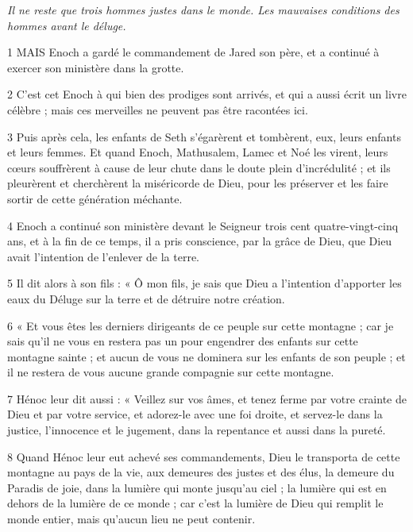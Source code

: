 \par \textit{Il ne reste que trois hommes justes dans le monde. Les mauvaises conditions des hommes avant le déluge.}

\par 1 MAIS Enoch a gardé le commandement de Jared son père, et a continué à exercer son ministère dans la grotte.

\par 2 C'est cet Enoch à qui bien des prodiges sont arrivés, et qui a aussi écrit un livre célèbre ; mais ces merveilles ne peuvent pas être racontées ici.

\par 3 Puis après cela, les enfants de Seth s'égarèrent et tombèrent, eux, leurs enfants et leurs femmes. Et quand Enoch, Mathusalem, Lamec et Noé les virent, leurs cœurs souffrèrent à cause de leur chute dans le doute plein d'incrédulité ; et ils pleurèrent et cherchèrent la miséricorde de Dieu, pour les préserver et les faire sortir de cette génération méchante.

\par 4 Enoch a continué son ministère devant le Seigneur trois cent quatre-vingt-cinq ans, et à la fin de ce temps, il a pris conscience, par la grâce de Dieu, que Dieu avait l'intention de l'enlever de la terre.

\par 5 Il dit alors à son fils : « Ô mon fils, je sais que Dieu a l'intention d'apporter les eaux du Déluge sur la terre et de détruire notre création.

\par 6 « Et vous êtes les derniers dirigeants de ce peuple sur cette montagne ; car je sais qu'il ne vous en restera pas un pour engendrer des enfants sur cette montagne sainte ; et aucun de vous ne dominera sur les enfants de son peuple ; et il ne restera de vous aucune grande compagnie sur cette montagne.

\par 7 Hénoc leur dit aussi : « Veillez sur vos âmes, et tenez ferme par votre crainte de Dieu et par votre service, et adorez-le avec une foi droite, et servez-le dans la justice, l'innocence et le jugement, dans la repentance et aussi dans la pureté.

\par 8 Quand Hénoc leur eut achevé ses commandements, Dieu le transporta de cette montagne au pays de la vie, aux demeures des justes et des élus, la demeure du Paradis de joie, dans la lumière qui monte jusqu'au ciel ; la lumière qui est en dehors de la lumière de ce monde ; car c'est la lumière de Dieu qui remplit le monde entier, mais qu'aucun lieu ne peut contenir.

